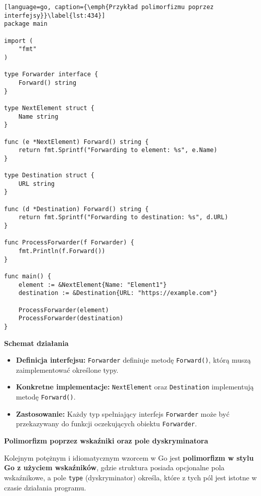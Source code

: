 \begin{lstlisting}[language=go, caption={\emph{Przykład polimorfizmu poprzez interfejsy}}\label{lst:434}]
package main

import (
	"fmt"
)

type Forwarder interface {
	Forward() string
}

type NextElement struct {
	Name string
}

func (e *NextElement) Forward() string {
	return fmt.Sprintf("Forwarding to element: %s", e.Name)
}

type Destination struct {
	URL string
}

func (d *Destination) Forward() string {
	return fmt.Sprintf("Forwarding to destination: %s", d.URL)
}

func ProcessForwarder(f Forwarder) {
	fmt.Println(f.Forward())
}

func main() {
	element := &NextElement{Name: "Element1"}
	destination := &Destination{URL: "https://example.com"}

	ProcessForwarder(element)
	ProcessForwarder(destination)
}
\end{lstlisting}

\textbf{Schemat działania}

\begin{itemize}
    \item \textbf{Definicja interfejsu:}  
    \texttt{Forwarder} definiuje metodę \texttt{Forward()}, którą muszą zaimplementować określone typy.
    
    \item \textbf{Konkretne implementacje:}  
    \texttt{NextElement} oraz \texttt{Destination} implementują metodę \texttt{Forward()}.
    
    \item \textbf{Zastosowanie:}  
    Każdy typ spełniający interfejs \texttt{Forwarder} może być przekazywany do funkcji oczekujących obiektu \texttt{Forwarder}.
\end{itemize}

\textbf{Polimorfizm poprzez wskaźniki oraz pole dyskryminatora}

Kolejnym potężnym i idiomatycznym wzorcem w Go jest \textbf{polimorfizm w stylu Go z użyciem wskaźników}, gdzie struktura posiada opcjonalne pola wskaźnikowe, a pole \texttt{type} (dyskryminator) określa, które z tych pól jest istotne w czasie działania programu.

